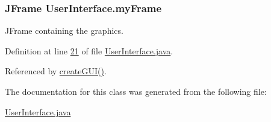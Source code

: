 \hypertarget{classUserInterface_a1bb844238b260f6d4ae1852b6b1e0b97}{
\subsubsection[{my\-Frame}]{\setlength{\rightskip}{0pt plus 5cm}J\-Frame User\-Interface.\-my\-Frame\hspace{0.3cm}{\ttfamily [private]}}}\label{classUserInterface_a1bb844238b260f6d4ae1852b6b1e0b97}


J\-Frame containing the graphics. 



Definition at line \hyperlink{UserInterface_8java_source_l00021}{21} of file \hyperlink{UserInterface_8java_source}{User\-Interface.\-java}.



Referenced by \hyperlink{UserInterface_8java_source_l00106}{create\-G\-U\-I()}.



The documentation for this class was generated from the following file\-:\begin{DoxyCompactItemize}
\item 
\hyperlink{UserInterface_8java}{User\-Interface.\-java}\end{DoxyCompactItemize}
